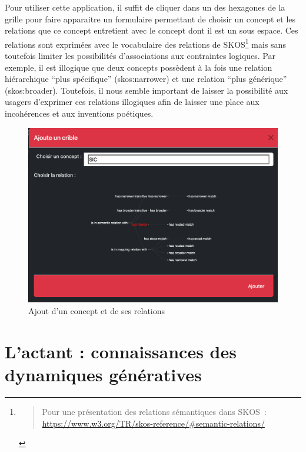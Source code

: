 \documentclass[
  letterpaper,
  DIV=11,
  numbers=noendperiod]{scrreprt}
\begin{document}
Pour utiliser cette application, il suffit de cliquer dans un des
hexagones de la grille pour faire apparaitre un formulaire permettant de
choisir un concept et les relations que ce concept entretient avec le
concept dont il est un sous espace. Ces relations sont exprimées avec le
vocabulaire des relations de SKOS\footnote{\begin{quote}
  Pour une présentation des relations sémantiques dans SKOS~:
  \url{https://www.w3.org/TR/skos-reference/\#semantic-relations/}
  \end{quote}} mais sans toutefois limiter les possibilités
d'associations aux contraintes logiques. Par exemple, il est illogique
que deux concepts possèdent à la fois une relation hiérarchique ``plus
spécifique'' (skos:narrower) et une relation ``plus générique''
(skos:broader). Toutefois, il nous semble important de laisser la
possibilité aux usagers d'exprimer ces relations illogiques afin de
laisser une place aux incohérences et aux inventions poétiques.

\begin{figure}

{\centering \includegraphics{images/localhost_samszo_HDR_docs_jdcCartoHexaAjoutCrible.html.png}

}

\caption{\label{fig-cartoHexaAjoutConcept}Ajout d'un concept et de ses
relations}

\end{figure}

\hypertarget{sec-espaceActant}{%
\section{L'actant : connaissances des dynamiques
génératives}\label{sec-espaceActant}}
\end{document}
